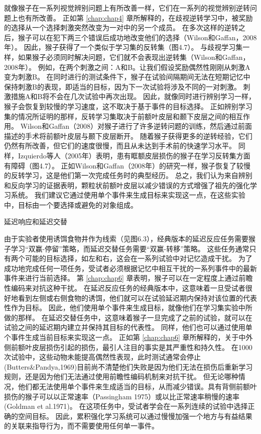 就像猴子在一系列视觉辨别问题上有所改善一样，它们在一系列的视觉辨别逆转问题上也有所改善。
正如第 \ref{chap:chap4} 章所解释的，在歧视逆转学习中，被奖励的选择从一个选择刺激突然改变为一对中的另一个成员。
在多次这样的逆转之后，猴子可以在犯下两三个错误后成功地改变他们的选择（Wilson和Gaffan，2008年）。
因此，猴子获得了一个类似于学习集的反转集（图4.7）。
与歧视学习集一样，如果猴子必须同时解决问题，它们就不会表现出逆转集（Wilson和Gaffan，2008年）。
例如，在两个刺激之间：A和B。让我们假设奖励偶然性刚刚从刺激A变为刺激B。
在同时进行的测试条件下，猴子在试验间隔期间无法在短期记忆中保持刺激B的表现，即适当的目标，因为下一次试验将涉及不同的一对刺激。
刺激措施A和B将不会在几次试验中再次出现。
因此，就像同时进行辨别学习一样，猴子会恢复到较慢的学习速度，这不取决于基于事件的目标选择。
正如辨别学习集的情况所证明的那样，反转学习集取决于前额叶皮层和颞下皮层之间的相互作用。
Wilson和Gaffan（2008）对猴子进行了许多逆转问题的训练，然后通过前面描述的手术将前额叶皮层与颞下皮层断开。
随着猴子获得更多的逆转经验，它们仍然有所改善，但它们的速度很慢，而且从未达到手术前的快速学习水平。
同样，Izquierdo等人（2005年）表明，患有眶额皮层损伤的猴子在学习反转集方面有障碍（图4.7）。
正如Wilson和Gaffan（2008年）的研究一样，猴子恢复了较慢的反转学习，这是他们第一次完成任务时的典型经历。
总之，我们认为来自辨别和反向学习的证据表明，颗粒状前额叶皮层以减少错误的方式增强了祖先的强化学习系统。
我们建议它通过使用单个事件来生成目标来实现这一点，在这些实验中，目标由一个要选择或避免的对象组成。



延迟响应和延迟交替

由于实验者使用诱饵食物井作为线索（见图6.3），经典版本的延迟反应任务需要猴子学习“双赢-停留”策略，而延迟交替任务需要“双赢-转移”策略。
这些任务通常只有两个可能的目标选择，如左和右，这会在一系列试验中对记忆造成干扰。
为了成功地完成任何一项任务，受试者必须根据记忆中相互干扰的一系列事件中的最新事件来进行当前选择。
第 \ref{chap:chap6} 章表明，猴子可以在一定程度上通过前瞻性编码来对抗这种干扰。
在延迟反应任务的经典版本中，这意味着一旦受试者很好地看到左侧或右侧食物的诱饵，他们就可以在试验延迟期内保持对该位置的代表性作为目标。
因此，他们使用单个事件来生成目标，就像他们在学习集实验中所做的那样。
在延迟交替任务中，这意味着猴子一旦完成了之前的试验，就可以在试验之间的延迟期内建立并保持其目标的代表性。
同样，他们也可以通过使用单个事件生成当前目标来实现这一点。
正如第 \ref{chap:chap6} 章所解释的，关于中外侧前额叶皮层损伤引起的损伤，最引人注目的事实是其严重性和持久性。
在1000次试验中，这些动物未能提高偶然性表现，此时测试通常会停止(Butters\&Pandya,1969)目前尚不清楚他们失败是因为他们无法在损伤后重新学习规则，还是因为他们无法通过使用前瞻性编码机制来对抗干扰。
但无论哪种情况，他们都无法使用单个事件来生成适当的目标，从而减少错误。具有背侧前额叶损伤的猴子可以以正常速率（Passingham 1975）或以比正常速率稍慢的速率(Goldman et al.1971)。
在这项任务中，受试者学会在一系列连续的试验中选择正确的空间目标。
因此，累积强化学习系统可以通过慢慢加强一个地方与有益结果的关联来指导行为，而不需要使用任何单一事件。



